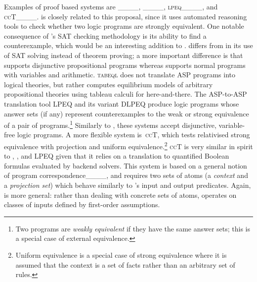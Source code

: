Examples of proof based systems are \selp____, \tabeql____, \textsc{lpeq}____, and \textsc{ccT}____.
\selp is closely related to this proposal, since it uses automated reasoning tools to check whether two logic programs are strongly equivalent.
One notable consequence of \selp's SAT checking methodology is its ability to find a counterexample, which would be an interesting addition to \anthem.
\selp differs from \anthem in its use of SAT solving instead of theorem proving; a more important difference is that \selp supports disjunctive propositional programs whereas \anthem supports normal programs with variables and arithmetic.
%
\textsc{tabeql} does not translate ASP programs into logical theories, but rather computes equilibrium models of arbitrary propositional theories using tableau calculi for here-and-there.
%
The ASP-to-ASP translation tool \textsc{LPEQ} and its variant \textsc{DLPEQ} produce logic programs whose answer sets (if any) represent counterexamples to the weak or strong equivalence of a pair of programs.\footnote{Two programs are \emph{weakly equivalent} if they have the same answer sets; this is a special case of external equivalence.}
Similarly to \selp, these systems accept disjunctive, variable-free logic programs.
A more flexible system is~\textsc{ccT}, which tests relativised strong equivalence with projection and uniform equivalence.\footnote{Uniform equivalence is a special case of strong equivalence where it is assumed that the context is a set of facts rather than an arbitrary set of rules.}
\textsc{ccT} is very similar in spirit to \anthem, \selp, and \textsc{LPEQ} given that it relies on a translation to quantified Boolean formulas evaluated by backend solvers.
This system is based on a general notion of program correspondence____, and requires two sets of atoms (a \emph{context} and a \emph{projection set}) which behave similarly to \anthem's input and output predicates.
Again, \anthem is more general: rather than dealing with concrete sets of atoms, \anthem operates on classes of inputs defined by first-order assumptions.



